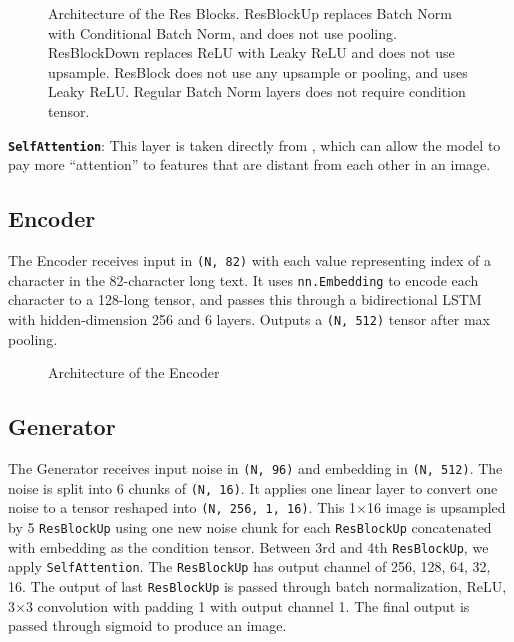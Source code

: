 \documentclass{article} %
\begin{document}
\begin{figure}[!hbpt]
    \begin{center}
        
    \end{center}
    \caption{Architecture of the Res Blocks. ResBlockUp replaces Batch Norm with Conditional Batch Norm, and does not use pooling. ResBlockDown replaces ReLU with Leaky ReLU and does not use upsample. ResBlock does not use any upsample or pooling, and uses Leaky ReLU. Regular Batch Norm layers does not require condition tensor.}
    \label{fig:resblocks}
\end{figure}

{\bf\texttt{SelfAttention}}: This layer is taken directly from \citep{zhang2019selfattention}, which can allow the model to pay more ``attention'' to features that are distant from each other in an image.

\subsection{Encoder}
The Encoder receives input in \texttt{(N, 82)} with each value representing index of a character in the 82-character long text. It uses \texttt{nn.Embedding} to encode each character to a 128-long tensor, and passes this through a bidirectional LSTM with hidden-dimension 256 and 6 layers. Outputs a \texttt{(N, 512)} tensor after max pooling.

\begin{figure}[!hbpt]
    \begin{center}
        
    \end{center}
    \caption{Architecture of the Encoder}
    \label{fig:encoder}
\end{figure}

\subsection{Generator}
The Generator receives input noise in \texttt{(N, 96)} and embedding in \texttt{(N, 512)}. The noise is split into 6 chunks of \texttt{(N, 16)}. It applies one linear layer to convert one noise to a tensor reshaped into \texttt{(N, 256, 1, 16)}. This 1$\times$16 image is upsampled by 5 \texttt{ResBlockUp} using one new noise chunk for each \texttt{ResBlockUp} concatenated with embedding as the condition tensor. Between 3rd and 4th \texttt{ResBlockUp}, we apply \texttt{SelfAttention}. The \texttt{ResBlockUp} has output channel of 256, 128, 64, 32, 16. The output of last \texttt{ResBlockUp} is passed through batch normalization, ReLU, 3$\times$3 convolution with padding 1 with output channel 1. The final output is passed through sigmoid to produce an image.
\end{document}
